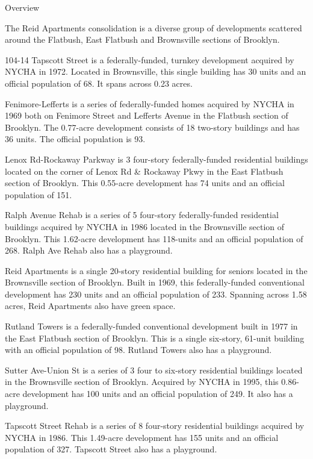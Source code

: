 Overview

The Reid Apartments consolidation is a diverse group of developments scattered around the Flatbush, East Flatbush and Brownsville sections of Brooklyn. 

104-14 Tapscott Street is a federally-funded, turnkey development acquired by NYCHA in 1972. Located in Brownsville, this single building has 30 units and an official population of 68. It spans across 0.23 acres. 

Fenimore-Lefferts is a series of federally-funded homes acquired by NYCHA in 1969 both on Fenimore Street and Lefferts Avenue in the Flatbush section of Brooklyn. The 0.77-acre development consists of 18  two-story buildings and has 36 units. The official population is 93. 

Lenox Rd-Rockaway Parkway is 3 four-story federally-funded residential buildings located on the corner of Lenox Rd & Rockaway Pkwy in the East Flatbush section of Brooklyn.  This 0.55-acre development has 74 units and an official population of 151.

Ralph Avenue Rehab is a series of 5 four-story federally-funded residential buildings acquired by NYCHA in 1986 located in the Brownsville section of Brooklyn. This 1.62-acre development has 118-units and an official population of 268. Ralph Ave Rehab also has a playground. 

Reid Apartments is a single 20-story residential building for seniors located in the Brownsville section of Brooklyn. Built in 1969, this federally-funded conventional development has 230 units and an official population of 233. Spanning across 1.58 acres, Reid Apartments also have green space. 

Rutland Towers is a federally-funded conventional development built in 1977 in the East Flatbush section of Brooklyn. This is a single six-story, 61-unit building with an official population of 98. Rutland Towers also has a playground. 

Sutter Ave-Union St is a series of 3 four to six-story residential buildings located in the Brownsville section of Brooklyn. Acquired by NYCHA in 1995, this 0.86-acre development has 100 units and an official population of 249. It also has a playground. 

Tapscott Street Rehab is a series of 8 four-story residential buildings acquired by NYCHA in 1986. This 1.49-acre development has 155 units and an official population of 327. Tapscott Street also has a playground. 
